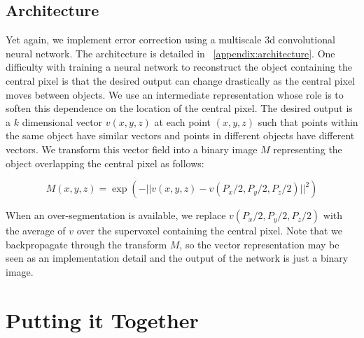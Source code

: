 \documentclass{article}
\begin{document}
\subsection{Architecture}
Yet again, we implement error correction using a multiscale 3d convolutional neural network. The architecture is detailed in ~\ref{appendix:architecture}. One difficulty with training a neural network to reconstruct the object containing the central pixel is that the desired output can change drastically as the central pixel moves between objects. We use an intermediate representation whose role is to soften this dependence on the location of the central pixel. The desired output is a $k$ dimensional vector $v(x,y,z)$ at each point $(x,y,z)$ such that points within the same object have similar vectors and points in different objects have different vectors. We transform this vector field into a binary image $M$ representing the object overlapping the central pixel as follows:

\begin{equation*}
	M(x,y,z)=\exp(-||v(x,y,z)-v(P_x/2,P_y/2,P_z/2)||^2)
\end{equation*}

When an over-segmentation is available, we replace $v(P_x/2,P_y/2,P_z/2)$ with the average of $v$ over the supervoxel containing the central pixel. Note that we backpropagate through the transform $M$, so the vector representation may be seen as an implementation detail and the output of the network is just a binary image.


\section{Putting it Together}
\end{document}
